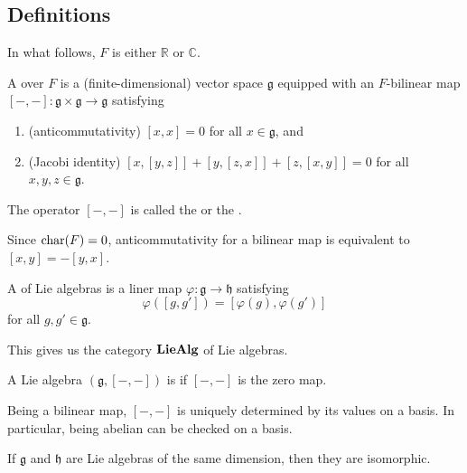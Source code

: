 \documentclass[12pt]{article}
\begin{document}
\subsection{Definitions}

In what follows, $F$ is either $\mathbb{R}$ or $\mathbb{C}$.
\begin{defn}
	A  over $F$ is a (finite-dimensional) vector space $\mathfrak{g}$ equipped with an $F$-bilinear map $[-, -] \colon \mathfrak{g} \times \mathfrak{g} \to \mathfrak{g}$ satisfying
	\begin{enumerate}[label=(\alph*)]
		\item (anticommutativity) $[x, x] = 0$ for all $x \in \mathfrak{g}$, and
		\item (Jacobi identity) $[x, [y, z]] + [y, [z, x]] + [z, [x, y]] = 0$ for all $x, y, z \in \mathfrak{g}$.
	\end{enumerate}
	The operator $[-, -]$ is called the  or the .
\end{defn}
Since $\operatorname{char}(F) = 0$, anticommutativity for a bilinear map is equivalent to $[x, y] = -[y, x]$. \newline

\begin{defn}
	A  of Lie algebras is a liner map $\varphi \colon \mathfrak{g} \to \mathfrak{h}$ satisfying
	\begin{equation*} 
		\varphi([g, g']) = [\varphi(g), \varphi(g')]
	\end{equation*}
	for all $g, g' \in \mathfrak{g}$.

	This gives us the category $\mathbf{LieAlg}$ of Lie algebras.
\end{defn}

\begin{defn}
	A Lie algebra $(\mathfrak{g}, [-, -])$ is  if $[-, -]$ is the zero map.
\end{defn}

\begin{rem}
	Being a bilinear map, $[-, -]$ is uniquely determined by its values on a basis. 
	In particular, being abelian can be checked on a basis.
\end{rem}

\begin{rem} \label{rem:abelian-lie-algebras-isomorphic}
	If $\mathfrak{g}$ and $\mathfrak{h}$ are Lie algebras of the same dimension, then they are isomorphic.
\end{rem}
\end{document}
